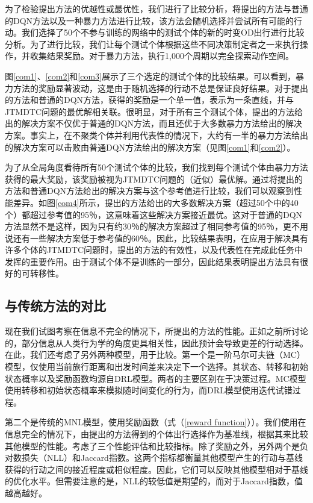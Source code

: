 为了检验提出方法的优越性或最优性，我们进行了比较分析，将提出的方法与普通的DQN方法以及一种暴力方法进行比较，该方法会随机选择并尝试所有可能的行动。我们选择了50个不参与训练的网络中的测试个体的新的时变OD出行进行比较分析。为了进行比较，我们让每个测试个体根据这些不同决策制定者之一来执行操作，并收集结果奖励。对于暴力方法，执行1,000个周期以完全探索动作空间。

图\ref{com1}、\ref{com2}和\ref{com3}展示了三个选定的测试个体的比较结果。可以看到，暴力方法的奖励显著波动，这是由于随机选择的行动不总是保证良好结果。对于提出的方法和普通的DQN方法，获得的奖励是一个单一值，表示为一条直线，并与JTMDTC问题的最优解相关联。很明显，对于所有三个测试个体，提出的方法给出的解决方案不仅优于普通的DQN方法，而且还优于大多数暴力方法给出的解决方案。事实上，在不聚类个体并利用代表性的情况下，大约有一半的暴力方法给出的解决方案可以击败由普通DQN方法给出的解决方案（见图\ref{com1}和\ref{com2}）。

为了从全局角度看待所有50个测试个体的比较，我们找到每个测试个体由暴力方法获得的最大奖励，该奖励被视为JTMDTC问题的（近似）最优解。通过将提出的方法和普通DQN方法给出的解决方案与这个参考值进行比较，我们可以观察到性能差异。如图\ref{com4}所示，提出的方法给出的大多数解决方案（超过50个中的40个）都超过参考值的95％，这意味着这些解决方案接近最优。这对于普通的DQN方法显然不是这样，因为只有约30％的解决方案超过了相同参考值的95％，更不用说还有一些解决方案低于参考值的60％。因此，比较结果表明，在应用于解决具有许多个体的JTMDTC问题时，提出的方法的有效性，以及代表性在完成此任务中发挥的重要作用。由于测试个体不是训练的一部分，因此结果表明提出方法具有很好的可转移性。

\subsection{与传统方法的对比}

现在我们试图考察在信息不完全的情况下，所提出的方法的性能。正如之前所讨论的，部分信息从人类行为学的角度更具相关性，因此预计会导致更差的行动选择。在此，我们还考虑了另外两种模型，用于比较。第一个是一阶马尔可夫链（MC）模型，仅使用当前旅行距离和出发时间差来决定下一个选择。其状态、转移和初始状态概率以及奖励函数均源自DRL模型。两者的主要区别在于决策过程。MC模型使用转移和初始状态概率来模拟随时间变化的行为，而DRL模型使用迭代试错过程。

第二个是传统的MNL模型，使用奖励函数（式（\ref{reward function}））。我们使用在信息完全的情况下，由提出的方法得到的个体出行选择作为基准线，根据其来比较其他模型的性能。考虑了三个性能评估和比较指标。除了奖励之外，另外两个是负对数损失（NLL）和Jaccard指数。这两个指标都衡量其他模型产生的行动与基线获得的行动之间的接近程度或相似程度。因此，它们可以反映其他模型相对于基线的优化水平。但需要注意的是，NLL的较低值是期望的，而对于Jaccard指数，值越高越好。

